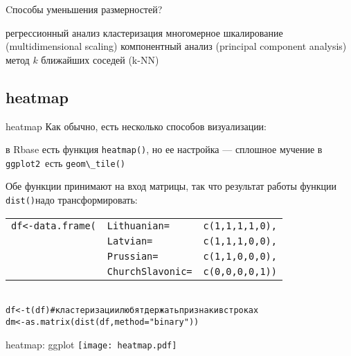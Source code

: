 \begin{frame}{Cпособы уменьшения размерностей?}
\begin{itemize}
\mytem регрессионный анализ
\mytem кластеризация
\mytem многомерное шкалирование (multidimensional scaling)
\mytem компонентный анализ (principal component analysis)
\mytem метод $k$ ближайших соседей (k-NN)
\end{itemize}
\end{frame}
\subsection{heatmap}
\begin{frame}{heatmap}
Как обычно, есть несколько способов визуализации:
\begin{itemize}
\mytem в Rbase есть функция \scriptsize\verb"heatmap()"\normalsize, но ее настройка — сплошное мучение
\mytem в \scriptsize\verb"ggplot2"\normalsize\ есть \scriptsize\verb"geom\_tile()"\normalsize
\end{itemize}
Обе функции принимают на вход матрицы, так что результат работы функции \scriptsize\verb"dist()"\normalsize надо трансформировать:
\scriptsize
\begin{alltt}
\begin{tabular}{lll}
df <- data.frame(& Lithuanian = & c(1, 1, 1, 1, 0), \\ 
 & Latvian = & c(1, 1, 1, 0, 0), \\ 
 & Prussian = & c(1, 1, 0, 0, 0), \\ 
 & ChurchSlavonic = & c(0, 0, 0, 0, 1)) \\ 
\end{tabular}
\\
df <- t(df) \hfill \# кластеризации любят держать признаки в строках\\
dm <- \alert{as.matrix(}dist(df, method = "binary")\alert{)}
\end{alltt}
\normalsize 
\end{frame}
\begin{frame}{heatmap: ggplot}
\texttt{[image: heatmap.pdf]}
\end{frame}

